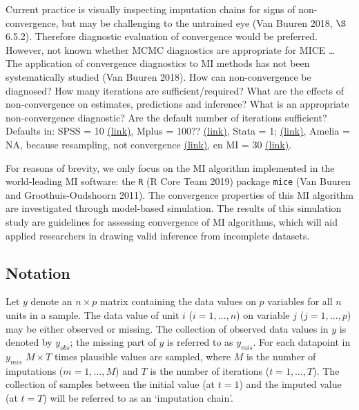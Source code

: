 \documentclass[
  Royal, times, sageapa]{sagej}
\begin{document}
Current practice is visually inspecting imputation chains for signs of
non-convergence, but may be challenging to the untrained eye (Van Buuren
2018, \(\S\) 6.5.2). Therefore diagnostic evaluation of convergence
would be preferred. However, not known whether MCMC diagnostics are
appropriate for MICE \ldots{} The application of convergence diagnostics
to MI methods has not been systematically studied (Van Buuren 2018). How
can non-convergence be diagnosed? How many iterations are
sufficient/required? What are the effects of non-convergence on
estimates, predictions and inference? What is an appropriate
non-convergence diagnostic? Are the default number of iterations
sufficient? Defaults in: SPSS = 10
\href{https://www.ibm.com/support/knowledgecenter/SSLVMB_24.0.0/spss/mva/syn_multiple_imputation_impute.html}{(link)},
Mplus = 100??
\href{https://pdfs.semanticscholar.org/e20e/29e008592cbfbaa567931f74cdfdb5451405.pdf?_ga=2.55354671.54033656.1584698748-527613517.1584698748}{(link)},
Stata = 1;
\href{https://www.stata.com/manuals13/mi.pdf,\%20p.\%20139}{(link)},
Amelia = NA, because resampling, not convergence
\href{https://cran.r-project.org/web/packages/Amelia/Amelia.pdf}{(link)},
en MI = 30
\href{https://cran.r-project.org/web/packages/mi/mi.pdf}{(link)}.

For reasons of brevity, we only focus on the MI algorithm implemented in
the world-leading MI software: the \texttt{R} (R Core Team 2019) package
\texttt{mice} (Van Buuren and Groothuis-Oudshoorn 2011). The convergence
properties of this MI algorithm are investigated through model-based
simulation. The results of this simulation study are guidelines for
assessing convergence of MI algorithms, which will aid applied
researchers in drawing valid inference from incomplete datasets.

\hypertarget{notation}{%
\subsection{Notation}\label{notation}}

Let \(y\) denote an \(n \times p\) matrix containing the data values on
\(p\) variables for all \(n\) units in a sample. The data value of unit
\(i\) (\(i = 1, \dots, n\)) on variable \(j\) (\(j = 1, \dots, p\)) may
be either observed or missing. The collection of observed data values in
\(y\) is denoted by \(y_{obs}\); the missing part of \(y\) is referred
to as \(y_{mis}\). For each datapoint in \(y_{mis}\) \(M \times T\)
times plausible values are sampled, where \(M\) is the number of
imputations (\(m = 1, \dots, M\)) and \(T\) is the number of iterations
(\(t = 1, \dots, T\)). The collection of samples between the initial
value (at \(t=1\)) and the imputed value (at \(t=T\)) will be referred
to as an `imputation chain'.
\end{document}
